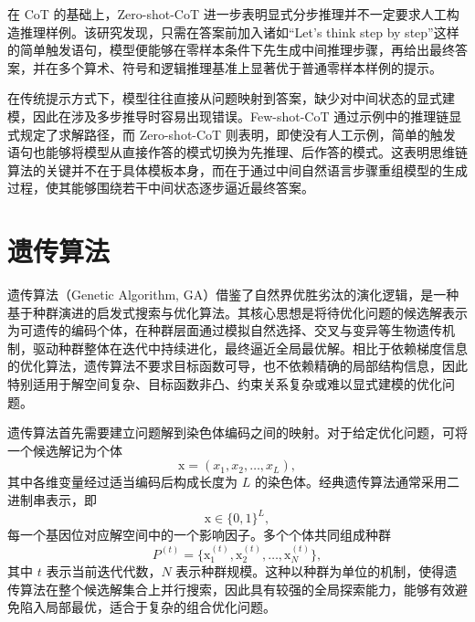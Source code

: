 在 CoT 的基础上，Zero-shot-CoT\cite{kojima2022large} 进一步表明显式分步推理并不一定要求人工构造推理样例。该研究发现，只需在答案前加入诸如“Let’s think step by step”这样的简单触发语句，模型便能够在零样本条件下先生成中间推理步骤，再给出最终答案，并在多个算术、符号和逻辑推理基准上显著优于普通零样本样例的提示。


在传统提示方式下，模型往往直接从问题映射到答案，缺少对中间状态的显式建模，因此在涉及多步推导时容易出现错误。Few-shot-CoT 通过示例中的推理链显式规定了求解路径，而 Zero-shot-CoT 则表明，即使没有人工示例，简单的触发语句也能够将模型从直接作答的模式切换为先推理、后作答的模式。这表明思维链算法的关键并不在于具体模板本身，而在于通过中间自然语言步骤重组模型的生成过程，使其能够围绕若干中间状态逐步逼近最终答案。

\section{遗传算法}
\label{sec:genetic_algorithm}

遗传算法（Genetic Algorithm\cite{holland1992adaptation}, GA）借鉴了自然界优胜劣汰的演化逻辑，是一种基于种群演进的启发式搜索与优化算法。其核心思想是将待优化问题的候选解表示为可遗传的编码个体，在种群层面通过模拟自然选择、交叉与变异等生物遗传机制，驱动种群整体在迭代中持续进化，最终逼近全局最优解。相比于依赖梯度信息的优化算法，遗传算法不要求目标函数可导，也不依赖精确的局部结构信息，因此特别适用于解空间复杂、目标函数非凸、约束关系复杂或难以显式建模的优化问题。

遗传算法首先需要建立问题解到染色体编码之间的映射。对于给定优化问题，可将一个候选解记为个体
\begin{equation}
\text{x} = (x_1, x_2, \dots, x_L),
\label{eq:ga_individual}
\end{equation}
其中各维变量经过适当编码后构成长度为 $L$ 的染色体。经典遗传算法通常采用二进制串表示，即
\begin{equation}
\text{x} \in \{0,1\}^{L},
\label{eq:ga_binary_encoding}
\end{equation}
每一个基因位对应解空间中的一个影响因子。多个个体共同组成种群
\begin{equation}
P^{(t)}=\{\text{x}_1^{(t)}, \text{x}_2^{(t)}, \dots, \text{x}_N^{(t)}\},
\label{eq:ga_population}
\end{equation}
其中 $t$ 表示当前迭代代数，$N$ 表示种群规模。这种以种群为单位的机制，使得遗传算法在整个候选解集合上并行搜索，因此具有较强的全局探索能力，能够有效避免陷入局部最优，适合于复杂的组合优化问题。

